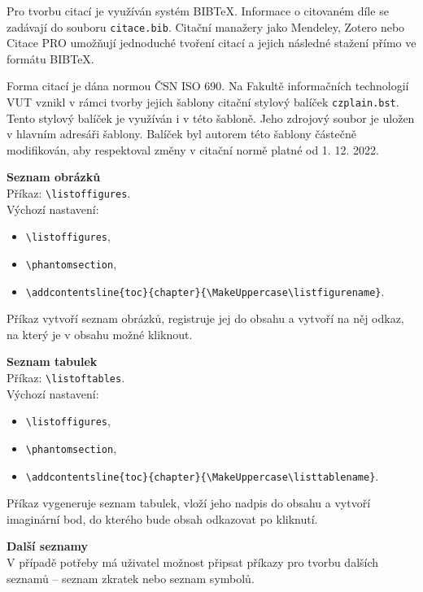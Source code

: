 Pro tvorbu citací je využíván systém BIB\TeX. Informace o citovaném díle se zadávají do souboru \verb|citace.bib|. Citační manažery jako Mendeley, Zotero nebo Citace PRO umožňují jednoduché tvoření citací a jejich následné stažení přímo ve formátu BIB\TeX. 

Forma citací je dána normou ČSN ISO 690. Na Fakultě informačních technologií VUT vznikl v rámci tvorby jejich šablony citační stylový balíček \verb|czplain.bst|. Tento stylový balíček je využíván i v této šabloně. Jeho zdrojový soubor je uložen v hlavním adresáři šablony. Balíček byl autorem této šablony částečně modifikován, aby respektoval změny v citační normě platné od 1. 12. 2022.

\vspace{8pt}

\textbf{Seznam obrázků}\\
Příkaz: \verb|\listoffigures|.\\
Výchozí nastavení:

\begin{itemize}[label={-}]
	\item \verb|\listoffigures|,
	\item \verb|\phantomsection|,
	\item \verb|\addcontentsline{toc}{chapter}{\MakeUppercase\listfigurename}|.
\end{itemize}

Příkaz vytvoří seznam obrázků, registruje jej do obsahu a vytvoří na něj odkaz, na který je v obsahu možné kliknout.

\vspace{8pt}

\textbf{Seznam tabulek}\\
Příkaz: \verb|\listoftables|.\\
Výchozí nastavení:

\begin{itemize}[label={-}]
	\item \verb|\listoffigures|,
	\item \verb|\phantomsection|,
	\item \verb|\addcontentsline{toc}{chapter}{\MakeUppercase\listtablename}|.
\end{itemize}

Příkaz vygeneruje seznam tabulek, vloží jeho nadpis do obsahu a vytvoří imaginární bod, do kterého bude obsah odkazovat po kliknutí.

\vspace{8pt}

\textbf{Další seznamy}\\
V případě potřeby má uživatel možnost připsat příkazy pro tvorbu dalších seznamů -- seznam zkratek nebo seznam symbolů.



